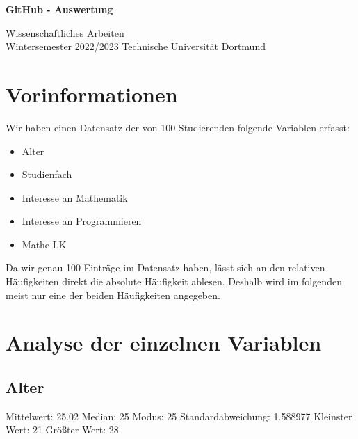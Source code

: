 \documentclass[paper=a4,                 %
               fontsize=12pt,            %
               parskip=half,             %
               ngerman,                 %
               ]{scrartcl}
\begin{document}
\begin{titlepage}
    \begin{center}
        \vspace*{3cm}
            
        \Huge
        \textbf{GitHub - Auswertung}
            
        \vspace{0.5cm}
        \LARGE
        Wissenschaftliches Arbeiten\\ 
        \Large
        Wintersemester 2022/2023
        \vspace{1.5cm}           
        \vfill    
        \vspace{0.8cm} 
        \Large
        Technische Universität Dortmund\\
            
    \end{center}
\end{titlepage}

\tableofcontents

\newpage
\section{Vorinformationen}
Wir haben einen Datensatz der von 100 Studierenden folgende Variablen erfasst:
\begin{itemize}
\item Alter
\item Studienfach
\item Interesse an Mathematik
\item Interesse an Programmieren
\item Mathe-LK
\end{itemize}

Da wir genau 100 Einträge im Datensatz haben, lässt sich an den relativen Häufigkeiten direkt die absolute Häufigkeit ablesen. Deshalb wird im folgenden meist nur eine der beiden Häufigkeiten angegeben.
\newpage
\section{Analyse der einzelnen Variablen}
\subsection{Alter}
Mittelwert: 25.02 \newline
Median:  25 \newline
Modus:  25 \newline
Standardabweichung:  1.588977 \newline
Kleinster Wert:  21 \newline
Größter Wert:  28 
\end{document}
